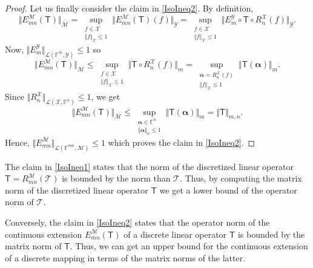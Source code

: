 \documentclass[a4paper]{paper}
\newcommand{\VecSpace}[1]{\mathscr{#1}}
\newcommand{\Field}{\mathbb{F}}
\newcommand{\Op}[1]{\mathcal{#1}}
\newcommand{\DiscOp}[1]{\mathsf{#1}}
\newcommand{\valpha}{\boldsymbol{\alpha}}
\begin{document}
\begin{proof}
Let us finally consider the claim in \eqref{IsoIneq2}. By definition,
\[
  \bigl\Vert E_{m n}^{\VecSpace{M}}(\DiscOp{T}) \bigr\Vert_{\VecSpace{M}}
  = 
  \sup_{\substack{f \in \VecSpace{X} \\ \Vert f \Vert_{\VecSpace{X}} \leq 1}}
    \bigl\Vert E_{m n}^{\VecSpace{M}}(\DiscOp{T})(f) \bigr\Vert_{\VecSpace{Y}}    
  =   
  \sup_{\substack{f \in \VecSpace{X} \\ \Vert f \Vert_{\VecSpace{X}} \leq 1}}
    \bigl\Vert E_{m}^{\VecSpace{Y}} \circ \DiscOp{T} \circ R_{n}^{\VecSpace{X}}(f) \bigr\Vert_{\VecSpace{Y}}.
\]
Now, $\Vert E_{m}^{\VecSpace{Y}} \Vert_{\VecSpace{L}(\Field^m, \VecSpace{Y})} \leq 1$  so
\[
  \bigl\Vert E_{m n}^{\VecSpace{M}}(\DiscOp{T}) \bigr\Vert_{\VecSpace{M}}
  \leq 
  \sup_{\substack{f \in \VecSpace{X} \\ \Vert f \Vert_{\VecSpace{X}} \leq 1}}
    \bigl\Vert \DiscOp{T} \circ R_{n}^{\VecSpace{X}}(f) \bigr\Vert_{m}
  =
  \sup_{\substack{\valpha = R_{n}^{\VecSpace{X}}\!(f) \\ \Vert f \Vert_{\VecSpace{X}}\leq1}}
    \bigl\Vert \DiscOp{T}(\valpha) \bigr\Vert_{m}.
\]
Since $\Vert R_{n}^{\VecSpace{X}} \Vert_{\VecSpace{L}(\VecSpace{X},\Field^n)} \leq 1$,
we get 
\[
  \bigl\Vert E_{m n}^{\VecSpace{M}}(\DiscOp{T}) \bigr\Vert_{\VecSpace{M}}
  \leq 
  \sup_{\substack{ \valpha \in \Field^n \\ \Vert \valpha \Vert_{n} \leq1}}
    \bigl\Vert \DiscOp{T}(\valpha) \bigr\Vert_{m}
  =
    \Vert \DiscOp{T} \Vert_{m,n}.
\]
Hence, $\Vert E_{m n}^{\VecSpace{M}} \Vert_{\VecSpace{L}(\Field^{mn},\VecSpace{M})} \leq 1$ which 
proves the claim in \eqref{IsoIneq2}.
\end{proof}

\begin{remark}
The claim in \eqref{IsoIneq1} states that the norm of the discretized linear operator $\DiscOp{T}=R_{m n}^{\VecSpace{M}}(\Op{T})$ 
is bounded by the norm than $\Op{T}$. Thus, by computing the matrix norm of the discretized linear operator $\DiscOp{T}$
we get a lower bound of the operator norm of $\Op{T}$. 

Conversely, the claim in \eqref{IsoIneq2} states that the operator norm of the continuous extension 
$E_{m n}^{\VecSpace{M}}(\DiscOp{T})$ of a discrete linear operator $\DiscOp{T}$ is bounded by the 
matrix norm of $\DiscOp{T}$. Thus, we can get an upper bound for the continuous extension of a 
discrete mapping in terms of the matrix norms of the latter.
\end{remark}
\end{document}
